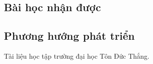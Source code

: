 \documentclass[12pt,a4paper,2sides]{report}
\begin{document}
\subsection{Bài học nhận được}

\subsection{Phương hướng phát triển}



\begin{thebibliography}{5}
	\bibitem{} Tài liệu học tập trường đại học Tôn Đức Thắng.
	\bibitem{}
	\bibitem{}
\end{thebibliography}
\end{document}

